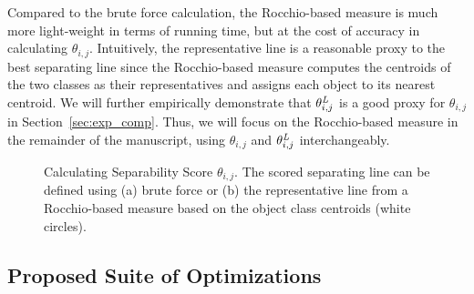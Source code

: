  Compared to the brute force calculation, the Rocchio-based measure is much more light-weight in terms of running time, but at the cost of accuracy in calculating $\theta_{i,j}$. Intuitively, the representative line is a reasonable proxy to the best separating line since the Rocchio-based measure computes the centroids of the two classes as their representatives and assigns each object to its nearest centroid. We will further empirically demonstrate that $\theta_{i,j}^{\mathit{L}}$ is a good proxy for $\theta_{i,j}$ in Section~\ref{sec:exp_comp}. Thus, we will focus on the Rocchio-based measure in the remainder of the manuscript, using $\theta_{i,j}$ and $\theta_{i,j}^{\mathit{L}}$ interchangeably.


\begin{figure}[h]
\centering %
\vspace{-5mm}
\vspace{-5mm}
\caption{Calculating Separability Score $\theta_{i,j}$. The scored separating line can be defined using (a) brute force or (b) the representative line from a Rocchio-based measure based on the object class centroids (white circles).}
\vspace{-5mm}
\label{fig:metric}
\end{figure}
\subsection{Proposed Suite of Optimizations}\label{sec:opt}

